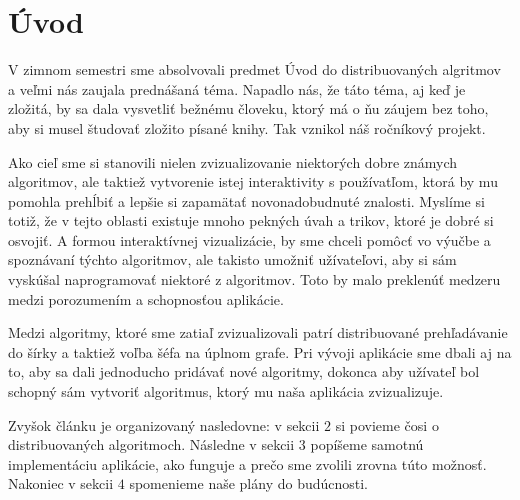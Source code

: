 \section{Úvod}

V zimnom semestri sme absolvovali predmet Úvod do distribuovaných algritmov a veľmi nás zaujala
prednášaná téma. Napadlo nás, že táto téma, aj keď je zložitá, by sa dala vysvetliť bežnému človeku,
ktorý má o ňu záujem bez toho, aby si musel študovať zložito písané knihy. Tak vznikol náš ročníkový
projekt.

Ako cieľ sme si stanovili nielen zvizualizovanie niektorých dobre známych algoritmov, ale taktiež
vytvorenie istej interaktivity s používatľom, ktorá by mu pomohla prehĺbiť a lepšie si zapamätať
novonadobudnuté znalosti. Myslíme si totiž, že v tejto oblasti existuje mnoho pekných úvah a trikov,
ktoré je dobré si osvojiť. A formou interaktívnej vizualizácie, by sme chceli pomôcť vo
výučbe a spoznávaní týchto algoritmov, ale takisto umožniť užívateľovi, aby si sám vyskúšal
naprogramovať niektoré z algoritmov. Toto by malo preklenúť medzeru medzi porozumením a schopnosťou
aplikácie.

Medzi algoritmy, ktoré sme zatiaľ zvizualizovali patrí distribuované prehľadávanie do šírky a
taktiež voľba šéfa na úplnom grafe. Pri vývoji aplikácie sme dbali aj na to, aby sa dali jednoducho
pridávať nové algoritmy, dokonca aby užívateľ bol schopný sám vytvoriť algoritmus, 
ktorý mu naša aplikácia zvizualizuje.

Zvyšok článku je organizovaný nasledovne: v sekcii $2$ si povieme čosi o distribuovaných
algoritmoch. Následne v sekcii $3$ popíšeme samotnú implementáciu aplikácie, ako
funguje a prečo sme zvolili zrovna túto možnosť. Nakoniec v sekcii $4$ spomenieme naše plány do budúcnosti.
